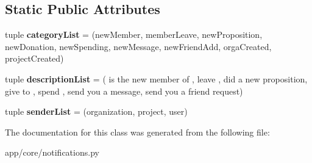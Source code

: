 \subsection*{Static Public Attributes}
\begin{DoxyCompactItemize}
\item 
\mbox{\label{classapp_1_1core_1_1notifications_1_1_notification_a9094447dc3fde435272f4b222cd403c6}} 
tuple {\bfseries category\+List} = (\textquotesingle{}new\+Member\textquotesingle{}, \textquotesingle{}member\+Leave\textquotesingle{}, \textquotesingle{}new\+Proposition\textquotesingle{}, \textquotesingle{}new\+Donation\textquotesingle{}, \textquotesingle{}new\+Spending\textquotesingle{}, \textquotesingle{}new\+Message\textquotesingle{}, \textquotesingle{}new\+Friend\+Add\textquotesingle{}, \textquotesingle{}orga\+Created\textquotesingle{}, \textquotesingle{}project\+Created\textquotesingle{})
\item 
\mbox{\label{classapp_1_1core_1_1notifications_1_1_notification_a8499d4a91eb1a863e89a4b2831c62886}} 
tuple {\bfseries description\+List} = (\textquotesingle{} is the new member of \textquotesingle{}, \textquotesingle{} leave \textquotesingle{}, \textquotesingle{}did a new proposition\textquotesingle{}, \textquotesingle{} give to \textquotesingle{}, \textquotesingle{} spend \textquotesingle{}, \textquotesingle{} send you a message\textquotesingle{}, \textquotesingle{} send you a friend request\textquotesingle{})
\item 
\mbox{\label{classapp_1_1core_1_1notifications_1_1_notification_a28064a7f598ff5c3c29a8d1129560b3a}} 
tuple {\bfseries sender\+List} = (\textquotesingle{}organization\textquotesingle{}, \textquotesingle{}project\textquotesingle{}, \textquotesingle{}user\textquotesingle{})
\end{DoxyCompactItemize}


The documentation for this class was generated from the following file\+:\begin{DoxyCompactItemize}
\item 
app/core/notifications.\+py\end{DoxyCompactItemize}
